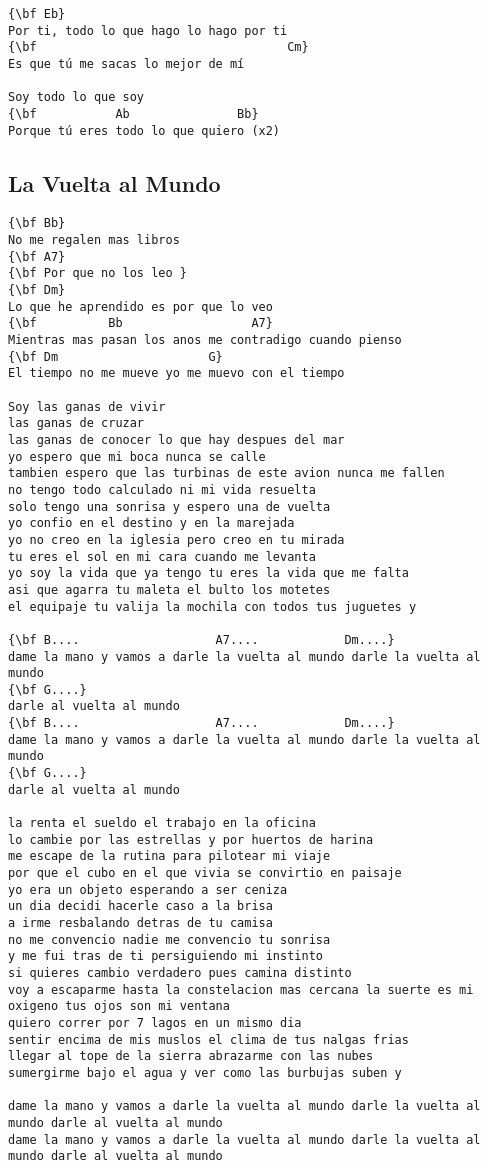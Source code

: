 \documentclass[a4paper]{article}
\begin{document}
\begin{Verbatim}[commandchars=\\\{\}]
{\bf Eb}
Por ti, todo lo que hago lo hago por ti
{\bf                                   Cm}
Es que tú me sacas lo mejor de mí

Soy todo lo que soy
{\bf           Ab               Bb}
Porque tú eres todo lo que quiero (x2)

\end{Verbatim}
\newpage
\subsection{La Vuelta al Mundo}
\begin{Verbatim}[commandchars=\\\{\}]
{\bf Bb}
No me regalen mas libros
{\bf A7}
{\bf Por que no los leo }
{\bf Dm}
Lo que he aprendido es por que lo veo 
{\bf          Bb                  A7}
Mientras mas pasan los anos me contradigo cuando pienso 
{\bf Dm                     G}
El tiempo no me mueve yo me muevo con el tiempo 

Soy las ganas de vivir 
las ganas de cruzar 
las ganas de conocer lo que hay despues del mar 
yo espero que mi boca nunca se calle 
tambien espero que las turbinas de este avion nunca me fallen 
no tengo todo calculado ni mi vida resuelta 
solo tengo una sonrisa y espero una de vuelta
yo confio en el destino y en la marejada 
yo no creo en la iglesia pero creo en tu mirada 
tu eres el sol en mi cara cuando me levanta 
yo soy la vida que ya tengo tu eres la vida que me falta 
asi que agarra tu maleta el bulto los motetes 
el equipaje tu valija la mochila con todos tus juguetes y 

{\bf B....                   A7....            Dm....}
dame la mano y vamos a darle la vuelta al mundo darle la vuelta al mundo 
{\bf G....}
darle al vuelta al mundo 
{\bf B....                   A7....            Dm....}
dame la mano y vamos a darle la vuelta al mundo darle la vuelta al mundo 
{\bf G....}
darle al vuelta al mundo 

la renta el sueldo el trabajo en la oficina 
lo cambie por las estrellas y por huertos de harina 
me escape de la rutina para pilotear mi viaje 
por que el cubo en el que vivia se convirtio en paisaje 
yo era un objeto esperando a ser ceniza 
un dia decidi hacerle caso a la brisa 
a irme resbalando detras de tu camisa 
no me convencio nadie me convencio tu sonrisa 
y me fui tras de ti persiguiendo mi instinto 
si quieres cambio verdadero pues camina distinto 
voy a escaparme hasta la constelacion mas cercana la suerte es mi oxigeno tus ojos son mi ventana 
quiero correr por 7 lagos en un mismo dia 
sentir encima de mis muslos el clima de tus nalgas frias 
llegar al tope de la sierra abrazarme con las nubes 
sumergirme bajo el agua y ver como las burbujas suben y

dame la mano y vamos a darle la vuelta al mundo darle la vuelta al mundo darle al vuelta al mundo 
dame la mano y vamos a darle la vuelta al mundo darle la vuelta al mundo darle al vuelta al mundo

\end{Verbatim}
\newpage
\end{document}
